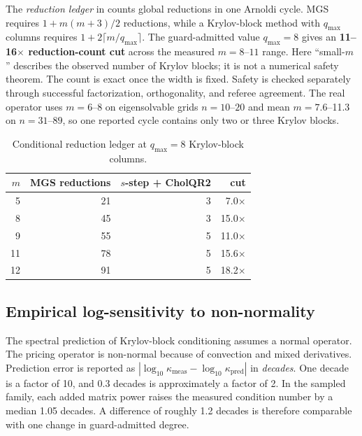 The \emph{reduction ledger} in  counts global reductions in one Arnoldi cycle. MGS requires $1+m(m+3)/2$ reductions, while a Krylov-block method with $q_{\max}$ columns requires $1+2\lceil m/q_{\max}\rceil$. The guard-admitted value $q_{\max}=8$ gives an \textbf{11--16$\times$ reduction-count cut} across the measured $m=8\text{--}11$ range. Here ``small-$m$'' describes the observed number of Krylov blocks; it is not a numerical safety theorem. The count is exact once the width is fixed. Safety is checked separately through successful factorization, orthogonality, and referee agreement. The real operator uses $m=6\text{--}8$ on eigensolvable grids $n=10\text{--}20$ and mean $m=7.6$--11.3 on $n=31\text{--}89$, so one reported cycle contains only two or three Krylov blocks.

\begin{table}[htbp!]
\centering
\caption{Conditional reduction ledger at $q_{\max}=8$ Krylov-block columns.}
\label{tab:ledger}
\begin{tabular}{@{}rrrr@{}}
\toprule
$m$ & \textbf{MGS reductions} & $s$\textbf{-step + CholQR2} & \textbf{cut} \\
\midrule
5  & 21 & 3 & 7.0$\times$ \\
8  & 45 & 3 & 15.0$\times$ \\
9  & 55 & 5 & 11.0$\times$ \\
11 & 78 & 5 & 15.6$\times$ \\
12 & 91 & 5 & 18.2$\times$ \\
\bottomrule
\end{tabular}
\end{table}

\subsection{Empirical log-sensitivity to non-normality}\label{sec:nonnormality}

The spectral prediction of Krylov-block conditioning assumes a normal operator. The pricing operator is non-normal because of convection and mixed derivatives. Prediction error is reported as $|\log_{10}\kappa_{\mathrm{meas}}-\log_{10}\kappa_{\mathrm{pred}}|$ in \emph{decades}. One decade is a factor of 10, and 0.3 decades is approximately a factor of 2. In the sampled family, each added matrix power raises the measured condition number by a median 1.05 decades. A difference of roughly 1.2 decades is therefore comparable with one change in guard-admitted degree.


